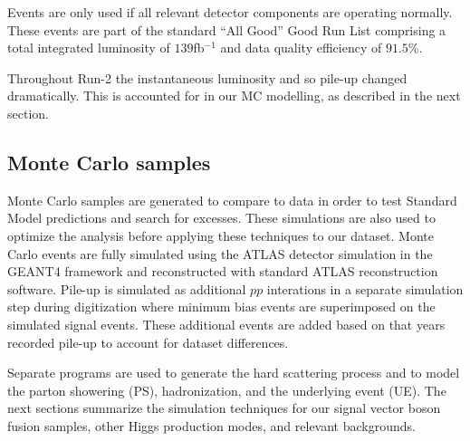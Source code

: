 Events are only used if all relevant detector components are operating normally. These events are part of the standard ``All Good'' Good Run List comprising a total integrated luminosity of $139$fb$^{-1}$ and data quality efficiency of $91.5$\%.

Throughout Run-2 the instantaneous luminosity and so pile-up changed dramatically. This is accounted for in our MC modelling, as described in the next section.

\subsection{Monte Carlo samples}


Monte Carlo samples are generated to compare to data in order to test Standard Model predictions and search for excesses. These simulations are also used to optimize the analysis before applying these techniques to our dataset. Monte Carlo events are fully simulated using the ATLAS detector simulation in the GEANT4 framework \cite{GEANT4} and reconstructed with standard ATLAS reconstruction software. Pile-up is simulated as additional $pp$ interations in a separate simulation step during digitization where minimum bias events are superimposed on the simulated signal events. These additional events are added based on that years recorded pile-up to account for dataset differences. 

Separate programs are used to generate the hard scattering process and to model the parton showering (PS), hadronization, and the underlying event (UE). The next sections summarize the simulation techniques for our signal vector boson fusion samples, other Higgs production modes, and relevant backgrounds.   


